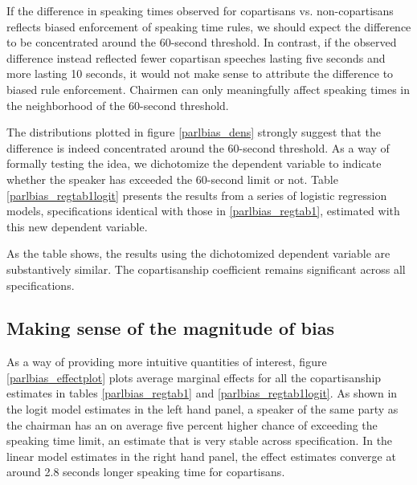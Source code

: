 \documentclass[12pt,a4paper]{article}
\begin{document}
If the difference in speaking times observed for copartisans vs. non-copartisans reflects biased enforcement of speaking time rules, we should expect the difference to be concentrated around the 60-second threshold. In contrast, if the observed difference instead reflected fewer copartisan speeches lasting five seconds and more lasting 10 seconds, it would not make sense to attribute the difference to biased rule enforcement. Chairmen can only meaningfully affect speaking times in the neighborhood of the 60-second threshold. 

The distributions plotted in figure \ref{parlbias_dens} strongly suggest that the difference is indeed concentrated around the 60-second threshold. As a way of formally testing the idea, we dichotomize the dependent variable to indicate whether the speaker has exceeded the 60-second limit or not. Table \ref{parlbias_regtab1logit} presents the results from a series of logistic regression models, specifications identical with those in \ref{parlbias_regtab1}, estimated with this new dependent variable.



As the table shows, the results using the dichotomized dependent variable are substantively similar. The copartisanship coefficient remains significant across all specifications. 

\subsection{Making sense of the magnitude of bias}
As a way of providing more intuitive quantities of interest, figure \ref{parlbias_effectplot} plots average marginal effects for all the copartisanship estimates in tables \ref{parlbias_regtab1} and \ref{parlbias_regtab1logit}. As shown in the logit model estimates in the left hand panel, a speaker of the same party as the chairman has an on average five percent higher chance of exceeding the speaking time limit, an estimate that is very stable across specification. In the linear model estimates in the right hand panel, the effect estimates converge at around 2.8 seconds longer speaking time for copartisans.
\end{document}
